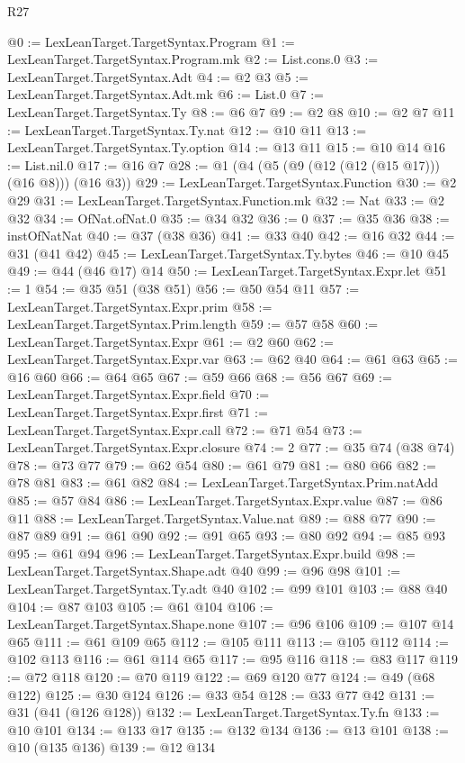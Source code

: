 \begin{lexlean}{R27}
\begin{coremodule}
@0 := LexLeanTarget.TargetSyntax.Program
@1 := LexLeanTarget.TargetSyntax.Program.mk
@2 := List.cons.{0}
@3 := LexLeanTarget.TargetSyntax.Adt
@4 := @2 @3
@5 := LexLeanTarget.TargetSyntax.Adt.mk
@6 := List.{0}
@7 := LexLeanTarget.TargetSyntax.Ty
@8 := @6 @7
@9 := @2 @8
@10 := @2 @7
@11 := LexLeanTarget.TargetSyntax.Ty.nat
@12 := @10 @11
@13 := LexLeanTarget.TargetSyntax.Ty.option
@14 := @13 @11
@15 := @10 @14
@16 := List.nil.{0}
@17 := @16 @7
@28 := @1 (@4 (@5 (@9 (@12 (@12 (@15 @17))) (@16 @8))) (@16 @3))
@29 := LexLeanTarget.TargetSyntax.Function
@30 := @2 @29
@31 := LexLeanTarget.TargetSyntax.Function.mk
@32 := Nat
@33 := @2 @32
@34 := OfNat.ofNat.{0}
@35 := @34 @32
@36 := 0
@37 := @35 @36
@38 := instOfNatNat
@40 := @37 (@38 @36)
@41 := @33 @40
@42 := @16 @32
@44 := @31 (@41 @42)
@45 := LexLeanTarget.TargetSyntax.Ty.bytes
@46 := @10 @45
@49 := @44 (@46 @17) @14
@50 := LexLeanTarget.TargetSyntax.Expr.let
@51 := 1
@54 := @35 @51 (@38 @51)
@56 := @50 @54 @11
@57 := LexLeanTarget.TargetSyntax.Expr.prim
@58 := LexLeanTarget.TargetSyntax.Prim.length
@59 := @57 @58
@60 := LexLeanTarget.TargetSyntax.Expr
@61 := @2 @60
@62 := LexLeanTarget.TargetSyntax.Expr.var
@63 := @62 @40
@64 := @61 @63
@65 := @16 @60
@66 := @64 @65
@67 := @59 @66
@68 := @56 @67
@69 := LexLeanTarget.TargetSyntax.Expr.field
@70 := LexLeanTarget.TargetSyntax.Expr.first
@71 := LexLeanTarget.TargetSyntax.Expr.call
@72 := @71 @54
@73 := LexLeanTarget.TargetSyntax.Expr.closure
@74 := 2
@77 := @35 @74 (@38 @74)
@78 := @73 @77
@79 := @62 @54
@80 := @61 @79
@81 := @80 @66
@82 := @78 @81
@83 := @61 @82
@84 := LexLeanTarget.TargetSyntax.Prim.natAdd
@85 := @57 @84
@86 := LexLeanTarget.TargetSyntax.Expr.value
@87 := @86 @11
@88 := LexLeanTarget.TargetSyntax.Value.nat
@89 := @88 @77
@90 := @87 @89
@91 := @61 @90
@92 := @91 @65
@93 := @80 @92
@94 := @85 @93
@95 := @61 @94
@96 := LexLeanTarget.TargetSyntax.Expr.build
@98 := LexLeanTarget.TargetSyntax.Shape.adt @40
@99 := @96 @98
@101 := LexLeanTarget.TargetSyntax.Ty.adt @40
@102 := @99 @101
@103 := @88 @40
@104 := @87 @103
@105 := @61 @104
@106 := LexLeanTarget.TargetSyntax.Shape.none
@107 := @96 @106
@109 := @107 @14 @65
@111 := @61 @109 @65
@112 := @105 @111
@113 := @105 @112
@114 := @102 @113
@116 := @61 @114 @65
@117 := @95 @116
@118 := @83 @117
@119 := @72 @118
@120 := @70 @119
@122 := @69 @120 @77
@124 := @49 (@68 @122)
@125 := @30 @124
@126 := @33 @54
@128 := @33 @77 @42
@131 := @31 (@41 (@126 @128))
@132 := LexLeanTarget.TargetSyntax.Ty.fn
@133 := @10 @101
@134 := @133 @17
@135 := @132 @134
@136 := @13 @101
@138 := @10 (@135 @136)
@139 := @12 @134

\end{coremodule}
\end{lexlean}
